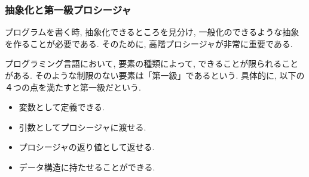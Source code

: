 \subsubsection*{抽象化と第一級プロシージャ}
プログラムを書く時, 抽象化できるところを見分け,
一般化のできるような抽象を作ることが必要である.
そのために, 高階プロシージャが非常に重要である.

プログラミング言語において, 要素の種類によって,
できることが限られることがある. そのような制限のない要素は「第一級」であるという.
具体的に, 以下の４つの点を満たすと第一級だという.

\begin{itemize}
\item 変数として定義できる.
\item 引数としてプロシージャに渡せる.
\item プロシージャの返り値として返せる.
\item データ構造に持たせることができる.
\end{itemize}

